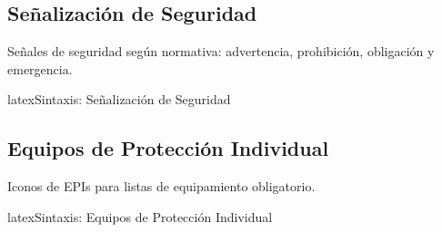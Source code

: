 \subsection{Señalización de Seguridad}
\label{subsec:senalizacion}

Señales de seguridad según normativa: advertencia, prohibición, obligación y emergencia.

\begin{codigosimple}{latex}{Sintaxis: Señalización de Seguridad}
\end{codigosimple}





\subsection{Equipos de Protección Individual}
\label{subsec:epis}

Iconos de EPIs para listas de equipamiento obligatorio.

\begin{codigosimple}{latex}{Sintaxis: Equipos de Protección Individual}
\begin{epilist}
  \item \epihardhat      %
  \item \epigloves       %
  \item \epigoggles      %
  \item \epiboots        %
  \item \epimask         %
  \item \epiearprotection %
  \item \epivest         %
  \item \epiharness      %
\end{epilist}
\end{codigosimple}

